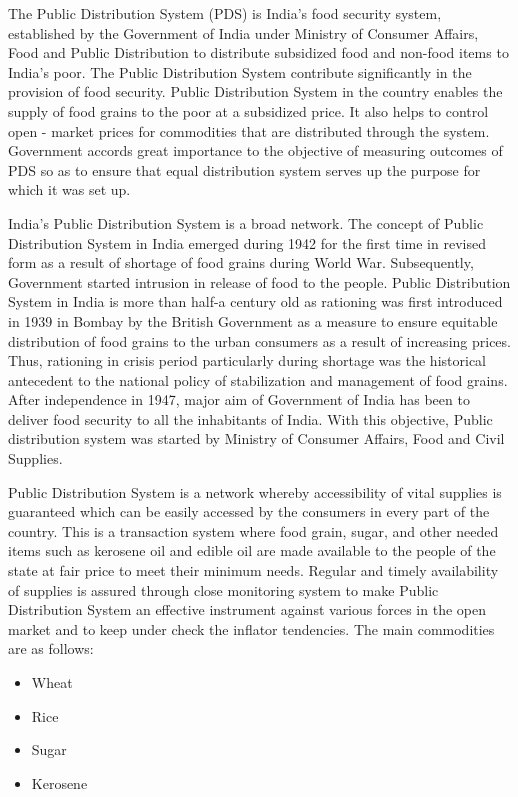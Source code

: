 \documentclass{article}
\begin{document}
The Public Distribution System (PDS) is India's food security system, established by the Government of India under Ministry of Consumer Affairs, Food and Public Distribution to distribute subsidized food and non-food items to India's poor. 
The Public Distribution System contribute significantly in the provision of food security. Public Distribution System in the country enables the supply of food grains to the poor at a subsidized price. It also helps to control open - market prices for commodities that are distributed through the system. Government accords great importance to the objective of measuring outcomes of PDS so as to ensure that equal distribution system serves up the purpose for which it was set up.\par
India's Public Distribution System is a broad network. The concept of Public Distribution System in India emerged during 1942 for the first time in revised form as a result of shortage of food grains during World War. Subsequently, Government started intrusion in release of food to the people. Public Distribution System in India is more than half-a century old as rationing was first introduced in 1939 in Bombay by the British Government as a measure to ensure equitable distribution of food grains to the urban consumers as a result of increasing prices. Thus, rationing in crisis period particularly during shortage was the historical antecedent to the national policy of stabilization and management of food grains. After independence in 1947, major aim of Government of India has been to deliver food security to all the inhabitants of India. With this objective, Public distribution system was started by Ministry of Consumer Affairs, Food and Civil Supplies. \par
Public Distribution System is a network whereby accessibility of vital supplies is guaranteed which can be easily accessed by the consumers in every part of the country. This is a transaction system where food grain, sugar, and other needed items such as kerosene oil and edible oil are made available to the people of the state at fair price to meet their minimum needs. Regular and timely availability of supplies is assured through close monitoring system to make Public Distribution System an effective instrument against various forces in the open market and to keep under check the inflator tendencies. The main commodities are as follows:
\begin{itemize}
\item Wheat
\item Rice
\item Sugar
\item Kerosene
\end{itemize}
\end{document}
